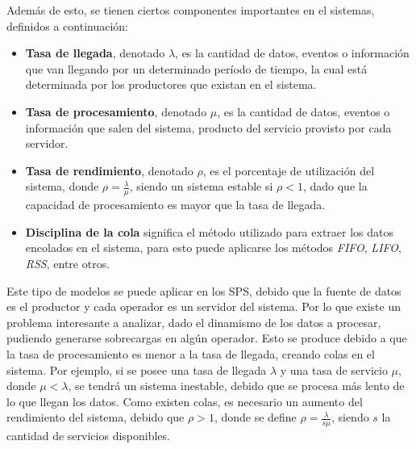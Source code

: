 Además de esto, se tienen ciertos componentes importantes en el sistemas, definidos a continuación:
\begin{itemize}
	\item \textbf{Tasa de llegada}, denotado $\lambda$, es la cantidad de datos, eventos o información que van llegando por un determinado período de tiempo, la cual está determinada por los productores que existan en el sistema.
	\item \textbf{Tasa de procesamiento}, denotado $\mu$, es la cantidad de datos, eventos o información que salen del sistema, producto del servicio provisto por cada servidor.
	\item \textbf{Tasa de rendimiento}, denotado $\rho$, es el porcentaje de utilización del sistema, donde $\rho = \frac{\lambda}{\mu}$, siendo un sistema estable si $\rho < 1$, dado que la capacidad de procesamiento es mayor que la tasa de llegada.
	\item \textbf{Disciplina de la cola} significa el método utilizado para extraer los datos encolados en el sistema, para esto puede aplicarse los métodos \textit{FIFO}, \textit{LIFO}, \textit{RSS}, entre otros.
\end{itemize}


Este tipo de modelos se puede aplicar en los SPS, debido que la fuente de datos es el productor y cada operador es un servidor del sistema. Por lo que existe un problema interesante a analizar, dado el dinamismo de los datos a procesar, pudiendo generarse sobrecargas en algún operador. Esto se produce debido a que la tasa de procesamiento es menor a la tasa de llegada, creando colas en el sistema. Por ejemplo, si se posee una tasa de llegada $\lambda$ y una tasa de servicio $\mu$, donde $\mu < \lambda$, se tendrá un sistema inestable, debido que se procesa más lento de lo que llegan los datos. Como existen colas, es necesario un aumento del rendimiento del sistema, debido que $\rho > 1 $, donde se define $\rho = \frac{\lambda}{s\mu}$, siendo $s$ la cantidad de servicios disponibles.